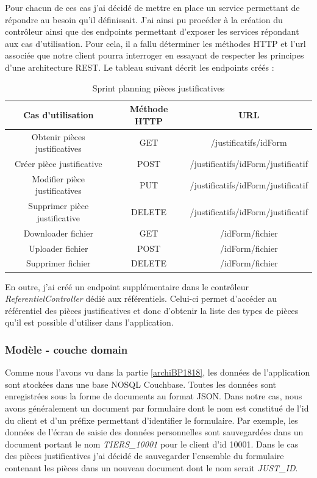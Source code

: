 	Pour chacun de ces cas j'ai décidé de mettre en place un service permettant de répondre au besoin qu'il définissait. J'ai ainsi pu procéder à la création du contrôleur ainsi que des endpoints permettant d'exposer les services répondant aux cas d'utilisation. Pour cela, il a fallu déterminer les méthodes HTTP et l'url associée que notre client pourra interroger en essayant de respecter les principes d'une architecture REST. Le tableau suivant décrit les endpoints créés :
	
\begin{table}[h!]
	\center
	\begin{tabular}{| c | c | c |}
     \hline
     Cas d'utilisation & Méthode HTTP & URL \\ \hline
     Obtenir pièces justificatives & GET & /justificatifs/{idForm}\\ \hline
     Créer pièce justificative & POST & /justificatifs/{idForm}/justificatif\\ \hline
     Modifier pièce justificatives & PUT & /justificatifs/{idForm}/justificatif\\ \hline
     Supprimer pièce justificative & DELETE & /justificatifs/{idForm}/justificatif\\ \hline
     Downloader fichier & GET & /{idForm}/fichier\\ \hline
     Uploader fichier & POST & /{idForm}/fichier\\ \hline
     Supprimer fichier & DELETE & /{idForm}/fichier\\ \hline
	\end{tabular}
	\caption{Sprint planning pièces justificatives}
	\label{sprintPlanningPJ}
\end{table}

	En outre, j'ai créé un endpoint supplémentaire dans le contrôleur \textit{ReferentielController} dédié aux référentiels. Celui-ci permet d'accéder au référentiel des pièces justificatives et donc d'obtenir la liste des types de pièces qu'il est possible d'utiliser dans l'application.

	\subsubsection{Modèle - couche domain}
	
	Comme nous l'avons vu dans la partie \ref{archiBP1818}, les données de l'application sont stockées dans une base NOSQL Couchbase. Toutes les données sont enregistrées sous la forme de documents au format JSON. Dans notre cas, nous avons généralement un document par formulaire dont le nom est constitué de l'id du client et d'un préfixe permettant d'identifier le formulaire. Par exemple, les données de l'écran de saisie des données personnelles sont sauvegardées dans un document portant le nom \textit{TIERS\_10001} pour le client d'id 10001. Dans le cas des pièces justificatives j'ai décidé de sauvegarder l'ensemble du formulaire contenant les pièces dans un nouveau document dont le nom serait \textit{JUST\_ID}. \\
	
